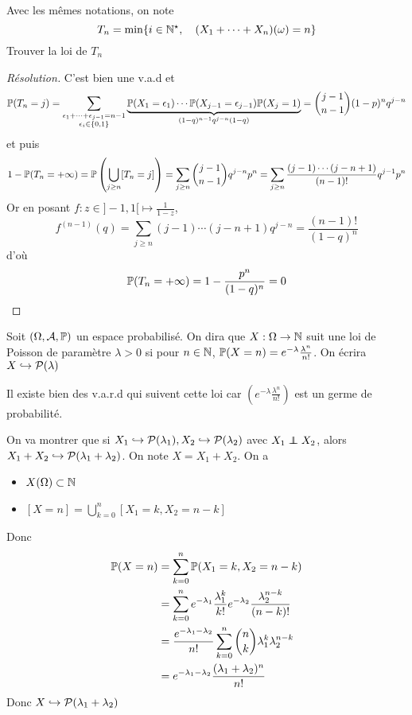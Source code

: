 \begin{exo}
Avec les mêmes notations, on note \[
    T_n=\min \{i\in \N^\star,\quad (X_1+\cdots +X_n)(\omega)=n\} 
\] 
Trouver la loi de $T_n$
\end{exo}

\begin{proof}[Résolution]
C'est bien une v.a.d et \[
    \P(T_n=j)=\sum_{\substack{\epsilon_1+\cdots +\epsilon_{j-1}=n-1\\\epsilon_i\in \{0,1\} }}\underbrace{\P(X_1=\epsilon_1)\cdots \P(X_{j-1}=\epsilon_{j-1})\P(X_j=1)}_{(1-q)^{n-1}q^{j-n}(1-q)}=\binom{j-1}{n-1}(1-p)^nq^{j-n}
\]
et puis \[
    1-\P(T_n=+\infty)=\P\left( \bigcup_{j\geq n} [T_n=j] \right) =\sum_{j\geq n}\binom{j-1}{n-1}q^{j-n}p^n=\sum_{j\geq n}\frac{(j-1)\cdots (j-n+1)}{(n-1)!}q^{j-1}p^n
\] 
Or en posant $f:z\in ]-1,1[ \longmapsto \frac{1}{1-z}$, \[
    f^{(n-1)}(q)=\sum_{j\geq n}(j-1)\cdots (j-n+1)q^{j-n}=\frac{(n-1)!}{(1-q)^n}
\] 
d'où \[
    \P(T_n=+\infty)=1-\frac{p^n}{(1-q)^n}=0
\]
\end{proof}

\begin{dfn}
    Soit $(\Omega, \mathcal  A, \P)$ un espace probabilisé. On dira que $X:\Omega\to \N$ suit une loi de Poisson de paramètre $\lambda>0$ si pour  $n\in \N$, $\P(X=n)=e^{-\lambda}\frac{\lambda^n}{n!}$. On écrira $X\suit \mathcal  P(\lambda)$
\end{dfn}

\begin{rem}
    Il existe bien des v.a.r.d qui suivent cette loi car $\displaystyle\left(e^{-\lambda}\frac{\lambda^n}{n!}\right)$ est un germe de probabilité.
\end{rem}

\begin{rem}
    On va montrer que si $X_1\suit\mathcal P(\lambda_1),X_2\suit \mathcal  P(\lambda_2)$ avec $X_1\indep X_2$, alors $X_1+X_2 \suit \mathcal  P(\lambda_1+\lambda_2)$. On note $X=X_1+X_2$. On a \begin{itemize}
        \item $X(\Omega)\subset \N$
        \item $\displaystyle [X=n]=\bigcup_{k=0}^n[X_1=k,X_2=n-k] $ 
    \end{itemize}
    Donc \begin{align*}
        \P(X=n)&=\sum_{k=0}^n\P(X_1=k,X_2=n-k)\\&= \sum_{k=0}^{n} e^{-\lambda_1}\frac{\lambda_1^k}{k!}e^{-\lambda_2}\frac{\lambda_2^{n-k}}{(n-k)!}\\&=\frac{e^{-\lambda_1-\lambda_2}}{n!} \sum_{k=0}^{n} \binom nk \lambda_1^k\lambda_2^{n-k}\\&=e^{-\lambda_1-\lambda_2}\frac{(\lambda_1+\lambda_2)^n}{n!}
    \end{align*}
    Donc $X\suit \mathcal  P(\lambda_1+\lambda_2)$
\end{rem}

\endchapter
